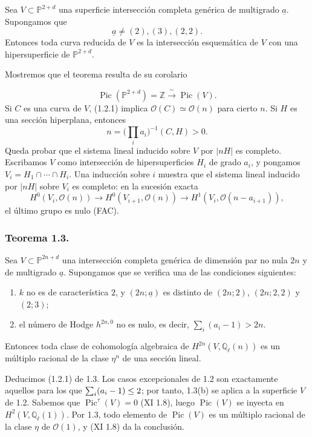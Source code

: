 Sea $V\subset\mathbb P^{2+d}$ una superficie intersección completa
genérica de multigrado $\underline a$. Supongamos que
\[
\underline a\ne(2),(3),(2,2).
\]
Entonces toda curva reducida de $V$ es la intersección esquemática de
$V$ con una hipersuperficie de $\mathbb P^{2+d}$.

Mostremos que el teorema resulta de su corolario

\pageoriginale

\begin{equation}\tag{1.2.1}
\operatorname{Pic}(\mathbb P^{2+d})=\mathbb Z
\xrightarrow{\ \sim\ }\operatorname{Pic}(V).
\end{equation}
Si $C$ es una curva de $V$, (1.2.1) implica
$\mathcal O(C)\simeq\mathcal O(n)$ para cierto $n$. Si $H$ es una
sección hiperplana, entonces
\[
n=\bigl(\textstyle\prod_i a_i\bigr)^{-1}(C,H)>0.
\]
Queda probar que el sistema lineal inducido sobre $V$ por $|nH|$ es
completo. Escribamos $V$ como intersección de hipersuperficies $H_i$ de
grado $a_i$, y pongamos $V_i=H_1\cap\cdots\cap H_i$. Una inducción sobre
$i$ muestra que el sistema lineal inducido por $|nH|$ sobre $V_i$ es
completo: en la sucesión exacta
\[
H^0(V_i,\mathcal O(n))\longrightarrow
H^0(V_{i+1},\mathcal O(n))\longrightarrow
H^1(V_i,\mathcal O(n-a_{i+1})),
\]
el último grupo es nulo (FAC).

\subsubsection*{Teorema 1.3.}

Sea $V\subset\mathbb P^{2n+d}$ una intersección completa genérica de
dimensión par no nula $2n$ y de multigrado $\underline a$. Supongamos
que se verifica una de las condiciones siguientes:
\begin{enumerate}[label=(\alph*)]
\item $k$ no es de característica $2$, y $(2n;\underline a)$ es
  distinto de $(2n;2)$, $(2n;2,2)$ y $(2;3)$;
\item el número de Hodge $h^{2n,0}$ no es nulo, es decir,
  $\sum_i(a_i-1)>2n$.
\end{enumerate}
Entonces toda clase de cohomología algebraica de
$H^{2n}(V,\mathbb Q_\ell(n))$ es un múltiplo racional de la clase
$\eta^n$ de una sección lineal.

Deducimos (1.2.1) de 1.3. Los casos excepcionales de 1.2 son exactamente
aquellos para los que
$\sum_i(\sisi{d_i}{a_i}-1)\leq2$; por tanto, 1.3(b) se aplica a la
superficie $V$ de 1.2. Sabemos que $\operatorname{Pic}^{\tau}(V)=0$
(XI 1.8), luego $\operatorname{Pic}(V)$ se inyecta en
$H^2(V,\mathbb Q_\ell(1))$. Por 1.3, todo elemento de
$\operatorname{Pic}(V)$ es un múltiplo racional de la clase $\eta$ de
$\mathcal O(1)$, y (XI 1.8) da la conclusión.

